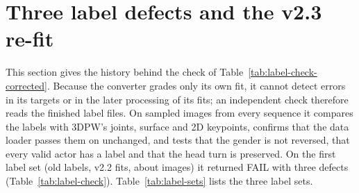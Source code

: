 \section{Three label defects and the v2.3 re-fit}
\label{sec:data-defects}

This section gives the history behind the check of Table~\ref{tab:label-check-corrected}. Because the converter grades only
its own fit, it cannot detect errors in its targets or in the later processing of its fits; an independent check
therefore reads the finished label files. On sampled images from every sequence it compares the
labels with 3DPW's joints, surface and 2D keypoints, confirms that the data loader passes them on unchanged, and
tests that the gender is not reversed, that every valid actor has a label and that the head turn is preserved. On the
first label set (old labels, v2.2 fits, about \DataOldCheckImages{} images) it returned FAIL with three defects
(Table~\ref{tab:label-check}). Table~\ref{tab:label-sets} lists the three label sets.



